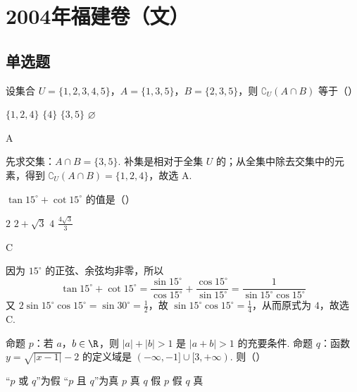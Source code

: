 
\chapter{2004年福建卷（文）}
\section{单选题}
\begin{problem}
设集合 \(U = \{1, 2, 3, 4, 5\}\)，\(A = \{1, 3, 5\}\)，\(B = \{2, 3, 5\}\)，则 \(\complement_U (A \cap B)\) 等于（\quad）

\choices
    {\(\{1,2,4\}\)}
    {\(\{4\}\)}
    {\(\{3,5\}\)}
    {\(\varnothing\)}
\end{problem}

\begin{answer}
A
\end{answer}

\begin{solution}
先求交集：\(A\cap B=\{3,5\}\). 补集是相对于全集 \(U\) 的；从全集中除去交集中的元素，得到
\(\complement_U(A\cap B)=\{1,2,4\}\)，故选 A.
\end{solution}

\begin{problem}
\(\tan 15^{\circ} + \cot 15^{\circ}\) 的值是（\quad）

\choices
    {\(2\)}
    {\(2 + \sqrt{3}\)}
    {\(4\)}
    {\(\frac{4\sqrt{3}}{3}\)}
\end{problem}

\begin{answer}
C
\end{answer}

\begin{solution}
因为 \(15^{\circ}\) 的正弦、余弦均非零，所以
\[
\tan15^{\circ}+\cot15^{\circ}
=\frac{\sin15^{\circ}}{\cos15^{\circ}}+\frac{\cos15^{\circ}}{\sin15^{\circ}}
=\frac{1}{\sin15^{\circ}\cos15^{\circ}}
\]
又 \(2\sin15^{\circ}\cos15^{\circ}=\sin30^{\circ}=\frac12\)，故
\(\sin15^{\circ}\cos15^{\circ}=\frac14\)，从而原式为 \(4\)，故选 C.
\end{solution}

\begin{problem}
命题 \(p\)：若 \(a\)，\(b \in \R\)，则 \(|a| + |b| > 1\) 是 \(|a + b| > 1\) 的充要条件. 命题 \(q\)：函数 \(y = \sqrt{|x - 1|} - 2\) 的定义域是 \((- \infty, -1] \cup [3, +\infty)\). 则（\quad）

\choices
    {“\(p\) 或 \(q\)”为假}
    {“\(p\) 且 \(q\)”为真}
    {\(p\) 真 \(q\) 假}
    {\(p\) 假 \(q\) 真}
\end{problem}

